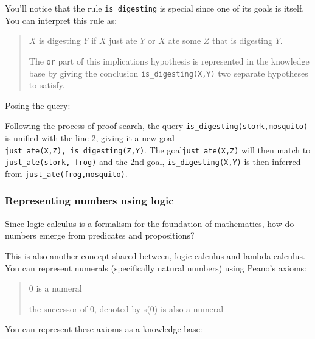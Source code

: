 You'll notice that the rule \texttt{is\_digesting} is special since one
of its goals is itself. You can interpret this rule as:

\begin{quote}
\(X\) is digesting \(Y\) if \(X\) just ate \(Y\) or \(X\) ate some \(Z\)
that is digesting \(Y\).

The \texttt{or} part of this implications hypothesis is represented in
the knowledge base by giving the conclusion \texttt{is\_digesting(X,Y)}
two separate hypotheses to satisfy.
\end{quote}

Posing the query:

\begin{Shaded}
\begin{Highlighting}[]
\KeywordTok{,}
\end{Highlighting}
\end{Shaded}

Following the process of proof search, the query
\texttt{is\_digesting(stork,mosquito)} is unified with the line 2,
giving it a new goal \texttt{just\_ate(X,Z),\ is\_digesting(Z,Y)}. The
goal\texttt{just\_ate(X,Z)} will then match to
\texttt{just\_ate(stork,\ frog)} and the 2nd goal,
\texttt{is\_digesting(X,Y)} is then inferred from
\texttt{just\_ate(frog,mosquito)}.

\subsubsection{Representing numbers using
logic}\label{logic-programming-paradigm.md__representing-numbers-using-logic}

Since logic calculus is a formalism for the foundation of mathematics,
how do numbers emerge from predicates and propositions?

This is also another concept shared between, logic calculus and lambda
calculus. You can represent numerals (specifically natural numbers)
using Peano's axioms:

\begin{quote}
0 is a numeral

the successor of 0, denoted by s(0) is also a numeral
\end{quote}

You can represent these axioms as a knowledge base:

\begin{Shaded}
\begin{Highlighting}[]
\NormalTok{)}
\NormalTok{)) }\KeywordTok{:{-}}\NormalTok{)}
\end{Highlighting}
\end{Shaded}

